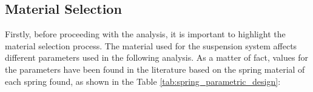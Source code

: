 \documentclass[11pt]{article}
\begin{document}
\subsection{Material Selection}
Firstly, before proceeding with the analysis, it is important to highlight the material selection process. The material used for the suspension system affects different parameters used in the following analysis. As a matter of fact, values for the parameters have been found in the literature based on the spring material of each spring found, as shown in the Table \ref{tab:spring_parametric_design}:

\begin{table}[H]
    \centering
    \caption{Material properties used in the analysis}
    \label{tab:material_properties}
\end{table}
\end{document}

